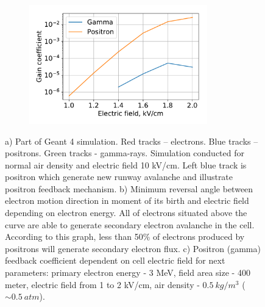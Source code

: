 \documentclass{webofc}
\begin{document}
\begin{figure}[t]
\begin{minipage}[b][\ht\leftpic][s]{0.5\linewidth}
\begin{center}
            \end{center}      
            \vfill
            
            \begin{center}
                \begin{subfigure}[b]{\textwidth}
                    \includegraphics[width=0.85\textwidth]{pictures/08_gain}
                    \caption{}
                    \label{pic-gain-a}
                \end{subfigure}
                
            \end{center}
        \end{minipage}
        \caption{ a) Part of Geant 4 simulation. Red tracks – electrons. Blue tracks – positrons. Green tracks - gamma-rays. Simulation conducted for normal air density and electric field 10 kV/cm. Left blue track is positron which generate new runway avalanche and illustrate positron feedback mechanism.
            b) Minimum reversal angle between electron motion direction in moment of its birth and electric field depending on electron energy. All of electrons situated above the curve are able to generate secondary electron avalanche in the cell. According to this graph, less than 50\% of electrons produced by positrons will generate secondary electron flux.
            c) Positron (gamma) feedback coefficient dependent on cell electric field for next parameters: primary electron energy - 3 MeV, field area size - 400 meter, electric field from 1 to 2 kV/cm, air density - $0.5~kg/m^3$ ($\sim 0.5~atm$).
        }    
    \end{figure}
    
\end{document}
